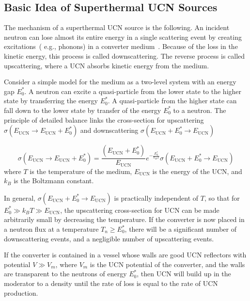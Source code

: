  
\subsection{Basic Idea of Superthermal UCN Sources\label{sec:basic_idea}}
The mechanism of a superthermal UCN source is the following.  An
incident neutron can lose almost its entire energy in a single
scattering event by creating excitations~( e.g., phonons) in a
converter medium~\cite{ucnbook, Golub75}. Because of the loss in the
kinetic energy, this process is called downscattering. The reverse
process is called upscattering, where a UCN absorbs kinetic energy from
the medium.


Consider a simple model for the medium as a two-level system with an
energy gap $E_0^*$. A neutron can excite a quasi-particle from the
lower state to the higher state by transferring the energy $E_0^*$. A
quasi-particle from the higher state can fall down to the lower state
by transfer of the energy $E_0^*$ to a neutron.  The principle of
detailed balance links the cross-section for upscattering
$\sigma(E_{\text{UCN}} \rightarrow E_{\text{UCN}}+E_0^*)$ and
downscattering
$\sigma(E_{\text{UCN}}+E_0^* \rightarrow
E_{\text{UCN}})$~\cite{ucnbook}

\begin{equation}
\label{eqn:detailed_balance}
\sigma(E_{\text{UCN}} \rightarrow E_{\text{UCN}}+E_0^*)= \frac{(E_{\text{UCN}}+E_0^*)}{E_{\text{UCN}}}
e^{-\frac{E_0^*}{k_B T}}\sigma(E_{\text{UCN}}+E_0^* \rightarrow E_{\text{UCN}})
\end{equation}
where $T$ is the temperature of the medium, $E_{\text{UCN}}$ is the
energy of the UCN, and $k_B$ is the Boltzmann constant.

In general, $\sigma(E_{\text{UCN}}+E_0^* \rightarrow E_{\text{UCN}})$
is practically independent of $T$, so that for
$E_0^* \gg k_B T \gg E_{\text{UCN}}$, the upscattering cross-section
for UCN can be made arbitrarily small by decreasing the
temperature. If the converter is now placed in a neutron flux at a
temperature $T_n \geq E_0^*$, there will be a significant number of
downscattering events, and a negligible number of upscattering events.

If the converter is contained in a vessel whose walls are good UCN
reflectors with potential $V \gg V_m$, where $V_m$ is the UCN potential
of the converter, and the walls are transparent to the neutrons of
energy $E_0^*$, then UCN will build up in the moderator to a density
until the rate of loss is equal to the rate of UCN production.

